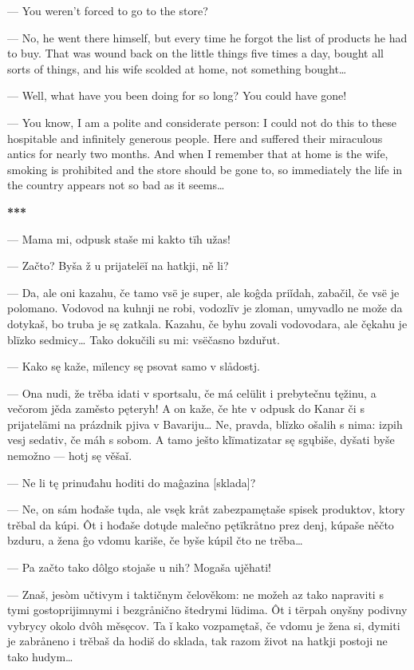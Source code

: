 — You weren’t forced to go to the store?

— No, he went there himself, but every time he forgot the list of products he had to buy. That was wound back on the little things five times a day, bought all sorts of things, and his wife scolded at home, not something bought…

— Well, what have you been doing for so long? You could have gone!

— You know, I am a polite and considerate person: I could not do this to these hospitable and infinitely generous people. Here and suffered their miraculous antics for nearly two months. And when I remember that at home is the wife, smoking is prohibited and the store should be gone to, so immediately the life in the country appears not so bad as it seems…

\begin{center}
	\textbf{***}
\end{center}

— Mama mi, odpusk staše mi kakto tïh užas!

— Začto? Byša ž u prijatelëǐ na hatkji, ně li?

— Da, ale oni kazahu, če tamo vsë je super, ale koĝda priǐdah, zabačil, če vsë je polomano. Vodovod na kuhnji ne robi, vodozlïv je zloman, umyvadlo ne može da dotykaš, bo truba je sę zatkala. Kazahu, če byhu zovali vodovodara, ale čękahu je blïzko sedmicy… Tako dokučili su mi: vsëčasno bzduřut.

— Kako sę kaže, mïlency sę psovat samo v slådostj.

— Ona nudi, že trěba idati v sportsalu, če má celülit i prebytečnu tęžinu, a večorom jěda zaměsto pęteryh! A on kaže, če hte v odpusk do Kanar či s prijatelämi na prázdnik pjiva v Bavariju… Ne, pravda, blïzko ošalih s nima: izpih vesj sedativ, če máh s sobom. A tamo ješto klïmatizatar sę sgųbiše, dyšati byše nemožno — hotj sę věšaǐ.

— Ne li tę prinuđahu hoditi do maĝazina [sklada]?

— Ne, on sám hođaše tųda, ale vsęk kråt zabezpamętaše spisek produktov, ktory trěbal da kúpi. Ôt i hođaše dotųde malečno pętïkråtno prez denj, kúpaše něčto bzduru, a žena ĝo vdomu kariše, če byše kúpil čto ne trěba…

— Pa začto tako dôlgo stojaše u nih? Mogaša ujěhati!

— Znaš, jesòm učtivym i taktičnym čelověkom: ne možeh az tako napraviti s tymi gostoprijimnymi i bezgrånično štedrymi lüdima. Ôt i tërpah onyšny podivny vybrycy okolo dvôh měsęcov. Ta ǐ kako vozpamętaš, če vdomu je žena si, dymiti je zabråneno i trěbaš da hodiš do sklada, tak razom život na hatkji postoji ne tako hudym…


